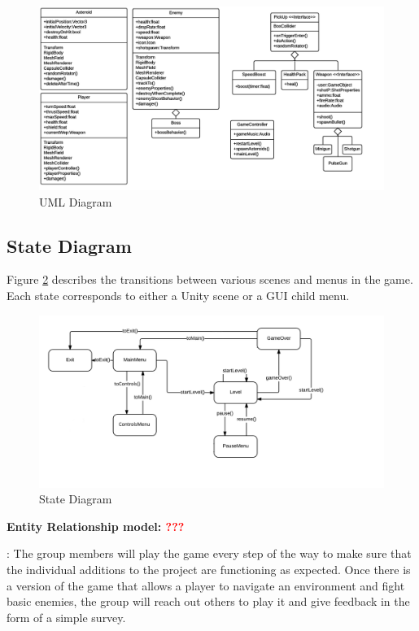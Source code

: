 \documentclass[12pt]{article}       %
\def\hs{\hspace{15pt}}
\begin{document}
\begin{figure} [H]
\centering
\includegraphics[width=7.3in]{FinalUMLHorizontal.png}
\caption{UML Diagram} \label{UML}
\end{figure}

\subsection{State Diagram}
Figure \ref{StateDia} describes the transitions between various scenes and menus in the game. Each state corresponds to either a Unity scene or a GUI child menu.

\begin{figure} [H]
\centering
\includegraphics[width=7in]{PewPewStateDiagramFinal.png}
\caption{State Diagram} \label{StateDia}
\end{figure}

{\bf Entity Relationship model: \textcolor{red}{???}}

\hs {\bf Testing plans}: The group members will play the game every step of the way to make sure that the individual additions to the project are functioning as expected. Once there is a version of the game that allows a player to navigate an environment and fight basic enemies, the group will reach out others to play it and give feedback in the form of a simple survey. 
\end{document}
